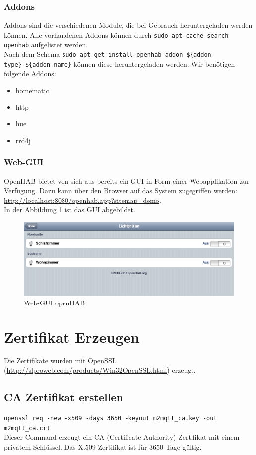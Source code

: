 \subsubsection*{Addons}
Addons sind die verschiedenen Module, die bei Gebrauch heruntergeladen werden können. Alle vorhandenen Addons können durch \lstinline!sudo apt-cache search openhab! aufgelistet werden. \\ Nach dem Schema \lstinline!sudo apt-get install openhab-addon-${addon-type}-${addon-name}! können diese heruntergeladen werden. Wir benötigen folgende Addons:
\begin{itemize}
	\item homematic
	\item http
	\item hue
	\item rrd4j
\end{itemize}

\subsubsection*{Web-GUI}
OpenHAB bietet von sich aus bereits ein GUI in Form einer Webapplikation zur Verfügung. Dazu kann über den Browser auf das System zugegriffen werden: \url{http://localhost:8080/openhab.app?sitemap=demo}.
\\ In der Abbildung \ref{fig:guiOpenhab} ist das GUI abgebildet.

\begin{figure}[H]
	\centering
		\includegraphics[scale=0.4]{appendix/img/standardGui}
	\caption{Web-GUI openHAB}
	\label{fig:guiOpenhab}
\end{figure}

\pagebreak
\section*{Zertifikat Erzeugen}
Die Zertifikate wurden mit OpenSSL (\url{http://slproweb.com/products/Win32OpenSSL.html}) erzeugt.

\subsection*{CA Zertifikat erstellen}
\lstinline!openssl req -new -x509 -days 3650 -keyout m2mqtt_ca.key -out m2mqtt_ca.crt! \\
Dieser Command erzeugt ein CA (Certificate Authority) Zertifikat mit einem privatem Schlüssel. Das X.509-Zertifikat ist für 3650 Tage gültig.

